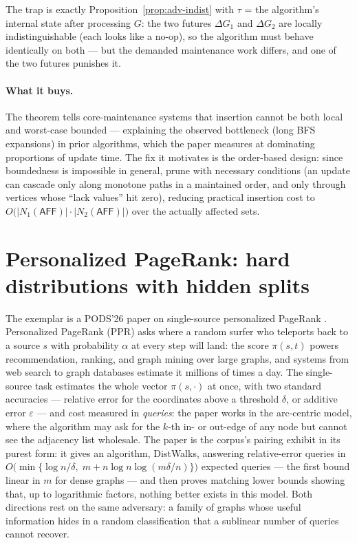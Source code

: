 The trap is exactly Proposition~\ref{prop:adv-indist} with $\tau$ = the algorithm's internal
state after processing $G$: the two futures $\Delta G_1$ and $\Delta G_2$ are locally
indistinguishable (each looks like a no-op), so the algorithm must behave identically on both
--- but the demanded maintenance work differs, and one of the two futures punishes it.

\paragraph{What it buys.}
The theorem tells core-maintenance systems that insertion cannot be both local and
worst-case bounded --- explaining the observed bottleneck (long BFS expansions) in prior
algorithms, which the paper measures at dominating proportions of update time. The fix it
motivates is the order-based design: since boundedness is impossible in general, prune with
necessary conditions (an update can cascade only along monotone paths in a maintained order,
and only through vertices whose ``lack values'' hit zero), reducing practical insertion cost
to $O\bigl(|N_1(\textsf{AFF})| \cdot |N_2(\textsf{AFF})|\bigr)$ over the actually affected
sets.

\section{Personalized PageRank: hard distributions with hidden splits}
\label{sec:adv-ppr}

The exemplar is a PODS'26 paper on single-source personalized PageRank \citep{sigmod26-166}\pods.
Personalized PageRank (PPR) asks where a random surfer who teleports back to a source $s$ with
probability $\alpha$ at every step will land: the score $\pi(s,t)$ powers recommendation,
ranking, and graph mining over large graphs, and systems from web search to graph databases
estimate it millions of times a day. The single-source task estimates the whole vector
$\pi(s,\cdot)$ at once, with two standard accuracies --- relative error for the coordinates
above a threshold $\delta$, or additive error $\varepsilon$ --- and cost measured in
\emph{queries}: the paper works in the arc-centric model, where the algorithm may ask for the
$k$-th in- or out-edge of any node but cannot see the adjacency list wholesale. The paper is
the corpus's pairing exhibit in its purest form: it gives an algorithm, DistWalks, answering
relative-error queries in
$O\bigl(\min\{\log n/\delta,\; m + n\log n\log(m\delta/n)\}\bigr)$ expected queries --- the
first bound linear in $m$ for dense graphs --- and then proves matching lower bounds showing
that, up to logarithmic factors, nothing better exists in this model. Both directions rest on
the same adversary: a family of graphs whose useful information hides in a random classification
that a sublinear number of queries cannot recover.

